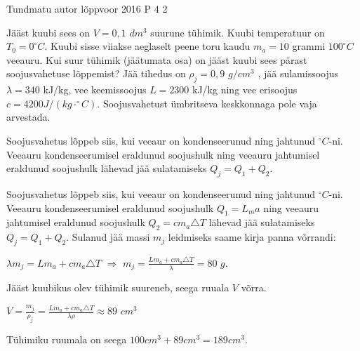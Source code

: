 {Tundmatu autor} %
{lõppvoor} %
{2016} %
{P 4} %
{2} %
{

\ifStatement
Jääst kuubi sees on $V = 0,1$ $dm^3$ suurune tühimik. Kuubi temperatuur on $T_0 = 0^{\circ}C$. Kuubi sisse viiakse aeglaselt peene toru kaudu $m_a = 10$ grammi $100 ^{\circ}C$ veeauru. Kui suur tühimik (jäätumata osa) on jääst kuubi sees pärast soojusvahetuse lõppemist? Jää tihedus on $\rho_j = 0,9$ $g/cm^3$ , jää sulamissoojus $\lambda = 340$ kJ/kg, vee keemissoojus $L = 2300$ kJ/kg ning vee erisoojus $c = 4200 J/(kg \cdot ^{\circ}C)$. Soojusvahetust ümbritseva keskkonnaga pole vaja arvestada. 
\fi

\ifHint
Soojusvahetus lõppeb siis, kui veeaur on kondenseerunud ning jahtunud $^{\circ}C$-ni. Veeauru kondenseerumisel eraldunud soojushulk ning veeauru jahtumisel eraldunud soojushulk lähevad jää sulatamiseks $Q_j = Q_1 + Q_2$.
\fi

\ifSolution
Soojusvahetus lõppeb siis, kui veeaur on kondenseerunud ning jahtunud $^{\circ}C$-ni. Veeauru kondenseerumisel eraldunud soojushulk $Q_1 = L_m a$ ning veeauru jahtumisel eraldunud soojushulk $Q_2 = cm_a \triangle T$ lähevad jää sulatamiseks $Q_j = Q_1 + Q_2$. Sulanud jää massi $m_j$ leidmiseks saame kirja panna võrrandi:
\begin{center}
$\lambda m_j = Lm_a + cm_a \triangle T$ $\Rightarrow$ $m_j = \frac{Lm_a + cm_a \triangle T}{\lambda} = 80$ $g$.
\end{center}
Jääst kuubikus olev tühimik suureneb, seega ruuala $V$ võrra. 
\begin{center}
$V = \frac{m_j}{\rho_j} = \frac{Lm_a + cm_a \triangle T}{\lambda \rho} \approx 89$ $cm^3$
\end{center}
Tühimiku ruumala on seega $100 cm^3 + 89 cm^3 = 189 cm^3$.
\fi
}